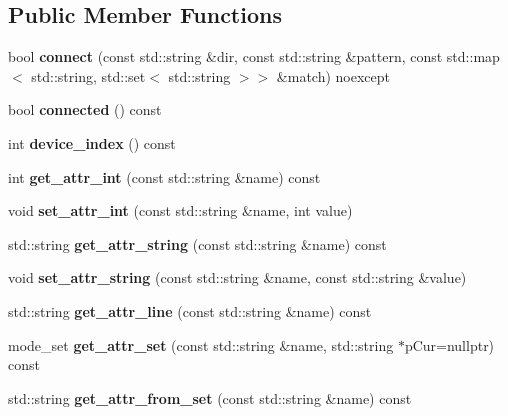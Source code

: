 \subsection*{Public Member Functions}
\begin{DoxyCompactItemize}
\item 
\mbox{\label{classev3dev_1_1device_a82d52a09c0d397535fe968f808be9584}} 
bool {\bfseries connect} (const std\+::string \&dir, const std\+::string \&pattern, const std\+::map$<$ std\+::string, std\+::set$<$ std\+::string $>$$>$ \&match) noexcept
\item 
\mbox{\label{classev3dev_1_1device_a795100a13407d08bb564deefa1675374}} 
bool {\bfseries connected} () const
\item 
\mbox{\label{classev3dev_1_1device_ab455b80e9bb3ff43e40064e6f8286ac8}} 
int {\bfseries device\+\_\+index} () const
\item 
\mbox{\label{classev3dev_1_1device_a8ae9c8a300d5832fef80ddcd9fd22b5c}} 
int {\bfseries get\+\_\+attr\+\_\+int} (const std\+::string \&name) const
\item 
\mbox{\label{classev3dev_1_1device_a0ba5a7e289707272d0aabfd67d436a00}} 
void {\bfseries set\+\_\+attr\+\_\+int} (const std\+::string \&name, int value)
\item 
\mbox{\label{classev3dev_1_1device_ac3922bce97693882fb99e54b25ee1f72}} 
std\+::string {\bfseries get\+\_\+attr\+\_\+string} (const std\+::string \&name) const
\item 
\mbox{\label{classev3dev_1_1device_a37423181452de22cc87c35cde68a487e}} 
void {\bfseries set\+\_\+attr\+\_\+string} (const std\+::string \&name, const std\+::string \&value)
\item 
\mbox{\label{classev3dev_1_1device_ac80de139c8236b8026472ddce30befbf}} 
std\+::string {\bfseries get\+\_\+attr\+\_\+line} (const std\+::string \&name) const
\item 
\mbox{\label{classev3dev_1_1device_a7cef90f639415b9828019ade5ee20a24}} 
mode\+\_\+set {\bfseries get\+\_\+attr\+\_\+set} (const std\+::string \&name, std\+::string $\ast$p\+Cur=nullptr) const
\item 
\mbox{\label{classev3dev_1_1device_aa5704d73ad29ee60e8e37e6a64fca5e8}} 
std\+::string {\bfseries get\+\_\+attr\+\_\+from\+\_\+set} (const std\+::string \&name) const
\end{DoxyCompactItemize}
